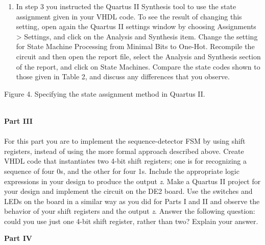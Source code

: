 \documentclass[epsfig,10pt,fullpage]{article}
\begin{document}
\begin{enumerate}
\item In step 3 you instructed the Quartus II Synthesis tool to use the state
assignment given in your VHDL code. To see the result of changing this setting, open
again the Quartus II settings window by choosing {\sf Assignments > Settings}, and 
click on the {\sf Analysis and Synthesis} item. Change the setting for  
{\sf State Machine Processing} from {\sf Minimal Bits} to {\sf One-Hot}. Recompile the
circuit and then open the report file, select the {\sf Analysis
and Synthesis} section of the report, and click on {\sf State Machines}.
Compare the state codes shown to those given in Table 2, and
discuss any differences that you observe.
\end{enumerate}

\begin{figure}[H]
\scriptsize
\centerline{
\hbox{}}
\end{figure}
\centerline{Figure 4.  Specifying the state assignment method in Quartus II.}
~\\
\noindent
{\bf Part III}
~\\
~\\
\noindent
For this part you are to implement the sequence-detector FSM by using shift registers,
instead of using the more formal approach described above. Create VHDL code that
instantiates two 4-bit shift registers; one is for recognizing a sequence of four 0s, and
the other for four 1s. Include the appropriate logic expressions in your design
to produce the output {\it z}. Make a Quartus II project for your design and implement
the circuit on the DE2 board. Use the switches and LEDs on the board in a similar way as
you did for Parts I and II and observe the behavior of your shift registers and the
output {\it z}. Answer the following question: could you use just one 4-bit shift
register, rather than two? Explain your answer.

\newpage
\noindent
{\bf Part IV}
\end{document}
